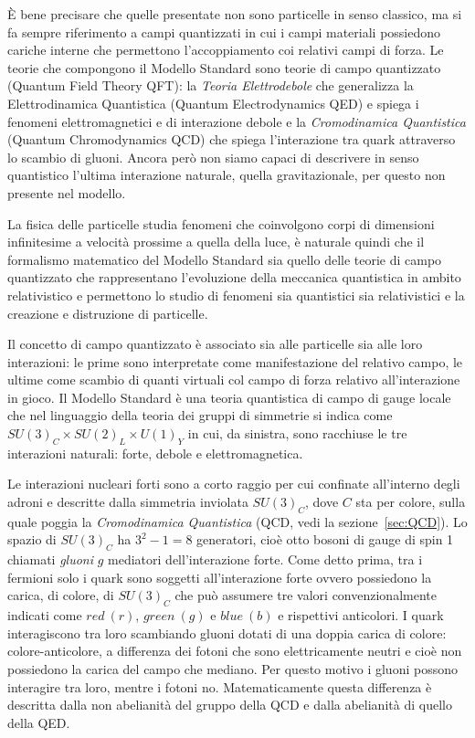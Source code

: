     È bene precisare che quelle presentate non sono particelle in senso classico, ma si fa sempre riferimento a campi quantizzati in cui i campi materiali possiedono cariche interne che permettono l'accoppiamento coi relativi campi di forza. Le teorie che compongono il Modello Standard sono teorie di campo quantizzato (Quantum Field Theory QFT): la \textit{Teoria Elettrodebole} che generalizza la Elettrodinamica Quantistica (Quantum Electrodynamics QED) e spiega i fenomeni elettromagnetici e di interazione debole e la \textit{Cromodinamica Quantistica} (Quantum Chromodynamics QCD) che spiega l'interazione tra quark attraverso lo scambio di gluoni. Ancora però non siamo capaci di descrivere in senso quantistico l'ultima interazione naturale, quella gravitazionale, per questo non presente nel modello.

    La fisica delle particelle studia fenomeni che coinvolgono corpi di dimensioni infinitesime a velocità prossime a quella della luce, è naturale quindi che il formalismo matematico del Modello Standard sia quello delle teorie di campo quantizzato che rappresentano l'evoluzione della meccanica quantistica in ambito relativistico e permettono lo studio di fenomeni sia quantistici sia relativistici e la creazione e distruzione di particelle.
    
    Il concetto di campo quantizzato è associato sia alle particelle sia alle loro interazioni: le prime sono interpretate come manifestazione del relativo campo, le ultime come scambio di quanti virtuali col campo di forza relativo all'interazione in gioco. Il Modello Standard è una teoria quantistica di campo di gauge locale che nel linguaggio della teoria dei gruppi di simmetrie si indica come $SU(3)_C \times SU(2)_L \times U(1)_Y$ in cui, da sinistra, sono racchiuse le tre interazioni naturali: forte, debole e elettromagnetica.

    Le interazioni nucleari forti sono a corto raggio per cui confinate all'interno degli adroni e descritte dalla simmetria inviolata $SU(3)_C$, dove $C$ sta per colore, sulla quale poggia la \textit{Cromodinamica Quantistica} (QCD, vedi la sezione~\ref{sec:QCD}). Lo spazio di $SU(3)_C$ ha $3^2 - 1 = 8$ generatori, cioè otto bosoni di gauge di spin 1 chiamati \textit{gluoni} $g$ mediatori dell'interazione forte. Come detto prima, tra i fermioni solo i quark sono soggetti all'interazione forte ovvero possiedono la carica, di colore, di $SU(3)_C$ che può assumere tre valori convenzionalmente indicati come $red\ (r)$, $green\ (g)$ e $blue\ (b)$ e rispettivi anticolori. I quark interagiscono tra loro scambiando gluoni dotati di una doppia carica di colore: colore-anticolore, a differenza dei fotoni che sono elettricamente neutri e cioè non possiedono la carica del campo che mediano. Per questo motivo i gluoni possono interagire tra loro, mentre i fotoni no. Matematicamente questa differenza è descritta dalla non abelianità del gruppo della QCD e dalla abelianità di quello della QED.

